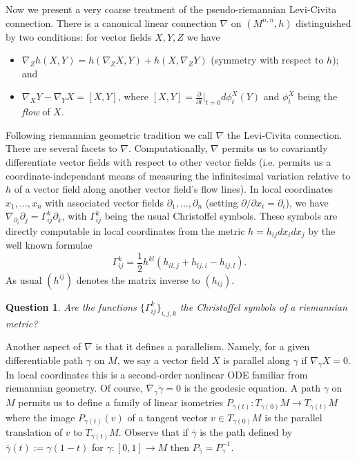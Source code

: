 \documentclass[12pt]{amsart}
\newtheorem*{question}{Question}
\theoremstyle{definition}
\theoremstyle{remark}
\newcommand{\del}{\partial}
\begin{document}
Now we present a very coarse treatment of the pseudo-riemannian Levi-Civita connection. There is a canonical linear connection $\nabla$ on $(M^{n,n},h)$ distinguished by two conditions: for vector fields $X,Y,Z$ we have 
\begin{itemize}
\item $\nabla_Zh(X,Y)=h(\nabla_ZX,Y)+ h(X,\nabla_ZY)$ (symmetry with respect to $h$); and 
\item $\nabla_X Y - \nabla_Y X = [X,Y]$, where $[X,Y]=\frac{\partial}{\partial t}|_{t=0} d\phi^X_t(Y)$ and $\phi^X_t$ being the \emph{flow} of $X$.
\end{itemize}
Following riemannian geometric tradition we call $\nabla$ the Levi-Civita connection. There are several facets to $\nabla$. Computationally, $\nabla$ permits us to covariantly differentiate vector fields with respect to other vector fields (i.e. permits us a coordinate-independant means of measuring the infinitesimal variation relative to $h$ of a vector field along another vector field's flow lines). In local coordinates $x_1, \ldots, x_n$ with associated vector fields $\del_1, \ldots, \del_n$ (setting $\del / \del x_i=\del_i$), we have $\nabla_{\del_i}\del_j=\Gamma^k_{ij}\del_k$, with $\Gamma^k_{ij}$ being the usual Christoffel symbols. These symbols are directly computable in local coordinates from the metric $h=h_{ij}dx_i dx_j$ by the well known formulae $$\Gamma^k_{ij}=\frac{1}{2}h^{kl}(h_{il,j}+h_{lj,i}-h_{ij,l}).$$ As usual $(h^{ij})$ denotes the matrix inverse to $(h_{ij})$. 

\begin{question}
Are the functions $\{\Gamma_{ij}^k\}_{i,j,k}$ the Christoffel symbols of a riemannian metric?
\end{question}

Another aspect of $\nabla$ is that it defines a parallelism. Namely, for a given differentiable path $\gamma$ on $M$, we say a vector field $X$ is parallel along $\gamma$ if $\nabla_{\dot{\gamma}}X=0$. In local coordinates this is a second-order nonlinear ODE familiar from riemannian geometry. Of course, $\nabla_{\dot{\gamma}}\dot{\gamma}=0$ is the geodesic equation. A path $\gamma$ on $M$ permits us to define a family of linear isometries $P_{\gamma(t)}: T_{\gamma(0)}M \to T_{\gamma(t)}M$ where the image $P_{\gamma(t)}(v)$ of a tangent vector $v\in T_{{\gamma}(0)}M$ is the parallel translation of $v$ to $T_{\gamma(t)}M$. Observe that if $\bar{\gamma}$ is the path defined by $\bar{\gamma}(t):=\gamma(1-t)$ for $\gamma:[0,1]\to M$ then $P_{\bar{\gamma}}=P^{-1}_\gamma$. 
\end{document}
